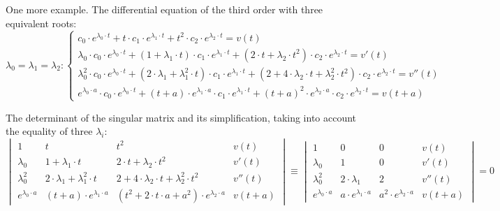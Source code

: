 \documentclass[a4paper, 11pt, oneside]{book}
\begin{document}
One more example. The differential equation of the third order with three equivalent roots:
\begin{equation}\label{eq:monolinear-equation-3order-3rep-roots}
  \lambda_0 = \lambda_1 = \lambda_2:
  \begin{cases}
    c_0 \cdot e^{\lambda_0 \cdot t} + t \cdot c_1 \cdot e^{\lambda_1 \cdot t} + t^2 \cdot c_2 \cdot e^{\lambda_2 \cdot t} = v(t) \\
    \lambda_0 \cdot c_0 \cdot e^{\lambda_0 \cdot t} + (1 + \lambda_1 \cdot t) \cdot c_1 \cdot e^{\lambda_1 \cdot t} + (2 \cdot t + \lambda_2 \cdot t^2) \cdot c_2 \cdot e^{\lambda_2 \cdot t} = v'(t) \\
    \lambda_0^2 \cdot c_0 \cdot e^{\lambda_0 \cdot t} + (2 \cdot \lambda_1 + \lambda_1^2 \cdot t) \cdot c_1 \cdot e^{\lambda_1 \cdot t} + (2 + 4 \cdot \lambda_2 \cdot t + \lambda_2^2 \cdot t^2) \cdot c_2 \cdot e^{\lambda_2 \cdot t} = v''(t) \\
    e^{\lambda_0 \cdot a} \cdot c_0 \cdot e^{\lambda_0 \cdot t} + (t + a) \cdot e^{\lambda_1 \cdot a} \cdot c_1 \cdot e^{\lambda_1 \cdot t} + (t + a)^2 \cdot e^{\lambda_2 \cdot a} \cdot c_2 \cdot e^{\lambda_2 \cdot t} = v(t + a)
  \end{cases}
\end{equation}

The determinant of the singular matrix and its simplification, taking into account the equality of three $\lambda_i$:
\begin{equation}\label{eq:monolinear-equation-3order-3rep-roots-2}
  \begin{vmatrix}
    1 & t & t^2 & v(t) \\
    \lambda_0 & 1 + \lambda_1 \cdot t & 2 \cdot t + \lambda_2 \cdot t^2 & v'(t) \\
    \lambda_0^2 & 2 \cdot \lambda_1 + \lambda_1^2 \cdot t &  2 + 4 \cdot \lambda_2 \cdot t + \lambda_2^2 \cdot t^2 & v''(t) \\
    e^{\lambda_0 \cdot a} & (t + a) \cdot e^{\lambda_1 \cdot a} & (t^2 + 2 \cdot t \cdot a + a^2) \cdot e^{\lambda_2 \cdot a} & v(t + a)
  \end{vmatrix}
  \equiv
  \begin{vmatrix}
    1 & 0 & 0 & v(t) \\
    \lambda_0 & 1 & 0 & v'(t) \\
    \lambda_0^2 & 2 \cdot \lambda_1 & 2 & v''(t) \\
    e^{\lambda_0 \cdot a} & a \cdot e^{\lambda_1 \cdot a} & a^2 \cdot e^{\lambda_2 \cdot a} & v(t + a)
  \end{vmatrix}
  =0
\end{equation}
\end{document}
